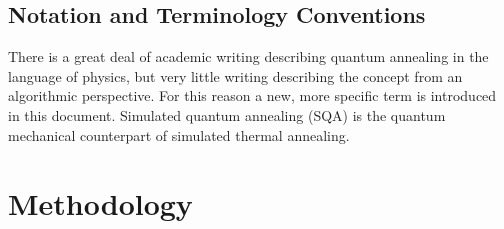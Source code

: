 \documentclass[11pt]{afthesis}
\begin{document}







\section{Notation and Terminology Conventions}

There is a great deal of academic writing describing quantum annealing in the language of physics, but very little writing describing the concept from an algorithmic perspective. For this reason a new, more specific term is introduced in this document. Simulated quantum annealing (SQA) is the quantum mechanical counterpart of simulated thermal annealing. 







\chapter{Methodology}
\end{document}
